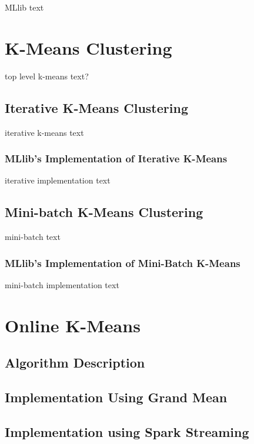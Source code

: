 \documentclass{l4proj}
\begin{document}
MLlib text


\chapter{K-Means Clustering}
\label{kmeans}

top level k-means text?

\section{Iterative K-Means Clustering}

iterative k-means text

\subsection{MLlib's Implementation of Iterative K-Means}

iterative implementation text

\section{Mini-batch K-Means Clustering}

mini-batch text

\subsection{MLlib's Implementation of Mini-Batch K-Means}

mini-batch implementation text


\chapter{Online K-Means}
\label{online}

\section{Algorithm Description}

\section{Implementation Using Grand Mean}

\section{Implementation using Spark Streaming}
\end{document}
